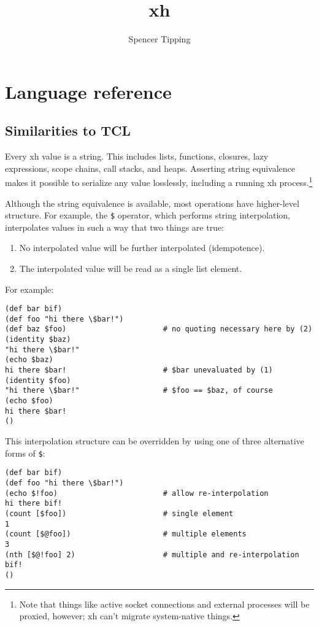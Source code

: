 \documentclass{report}
\title{xh}
\author{Spencer Tipping}
\begin{document}
\maketitle{}
\tableofcontents{}


\part{Language reference}\label{part:language-reference}
\chapter{Similarities to TCL}\label{chp:similarities-to-tcl}
  Every xh value is a string. This includes lists, functions, closures, lazy
  expressions, scope chains, call stacks, and heaps. Asserting string
  equivalence makes it possible to serialize any value losslessly, including a
  running xh process.\footnote{Note that things like active socket connections
  and external processes will be proxied, however; xh can't migrate
  system-native things.}

  Although the string equivalence is available, most operations have
  higher-level structure. For example, the \verb|$| operator, which performs
  string interpolation, interpolates values in such a way that two things are
  true:

\begin{enumerate}
\item{No interpolated value will be further interpolated (idempotence).}
\item{The interpolated value will be read as a single list element.}
\end{enumerate}

  For example:

\begin{verbatim}
(def bar bif)
(def foo "hi there \$bar!")
(def baz $foo)                      # no quoting necessary here by (2)
(identity $baz)
"hi there \$bar!"
(echo $baz)
hi there $bar!                      # $bar unevaluated by (1)
(identity $foo)
"hi there \$bar!"                   # $foo == $baz, of course
(echo $foo)
hi there $bar!
()
\end{verbatim}

  This interpolation structure can be overridden by using one of three
  alternative forms of \verb|$|:

\begin{verbatim}
(def bar bif)
(def foo "hi there \$bar!")
(echo $!foo)                        # allow re-interpolation
hi there bif!
(count [$foo])                      # single element
1
(count [$@foo])                     # multiple elements
3
(nth [$@!foo] 2)                    # multiple and re-interpolation
bif!
()
\end{verbatim}
\end{document}
